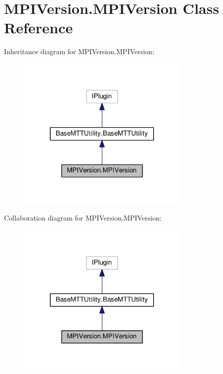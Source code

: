 \hypertarget{class_m_p_i_version_1_1_m_p_i_version}{\section{M\-P\-I\-Version.\-M\-P\-I\-Version Class Reference}
\label{class_m_p_i_version_1_1_m_p_i_version}
}


Inheritance diagram for M\-P\-I\-Version.\-M\-P\-I\-Version\-:
\nopagebreak
\begin{figure}[H]
\begin{center}
\leavevmode
\includegraphics[width=236pt]{class_m_p_i_version_1_1_m_p_i_version__inherit__graph}
\end{center}
\end{figure}


Collaboration diagram for M\-P\-I\-Version.\-M\-P\-I\-Version\-:
\nopagebreak
\begin{figure}[H]
\begin{center}
\leavevmode
\includegraphics[width=236pt]{class_m_p_i_version_1_1_m_p_i_version__coll__graph}
\end{center}
\end{figure}
